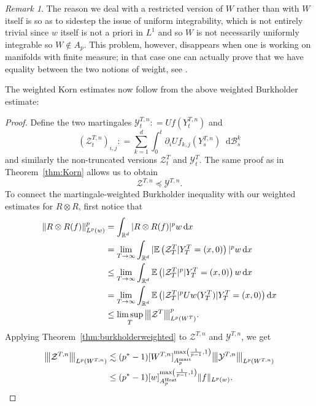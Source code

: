 \documentclass[11pt, a4paper]{amsart}
\theoremstyle{definition}
\theoremstyle{remark}
\newtheorem{remark}{Remark}
\newcommand{\R}{\mathbb{R}}
\newcommand*\diff{\mathop{}\!\mathrm{d}}
\newcommand{\vvvert}[1]{
    {\left\vert\kern-0.25ex\left\vert\kern-
    0.25ex\left\vert #1 
    \right\vert\kern-0.25ex\right\vert\kern-
    0.25ex\right\vert}
}
\begin{document}
\begin{remark}
The reason we deal with a restricted version of $W$
rather than with $W$ itself is so as to sidestep the issue of 
uniform integrability, which is not entirely trivial since $w$
itself is not a priori in $L^1$ and so $W$ is not
necessarily uniformly
integrable so $W\notin A_p$.
This problem, however, disappears when one is working
on manifolds with finite measure;
in that case one can actually prove that we have 
equality between the two notions of weight, see 
\cite[Theorem 4.2]{Li2019}.
\end{remark}
The weighted Korn estimates now follow from the 
above weighted Burkholder estimate:
\begin{proof}
Define the two martingales
$\mathcal Y^{T,n}_t\mathrel{:}=U f(Y^{T,n}_t)$ and 
\begin{equation*}
(\mathcal Z^{T,n}_t)_{i,j}\mathrel{:}=
\sum_{k=1}^d\int_0^t \partial_i U f_{k,j}(Y^{T,n}_s)
\diff \mathcal B^k_s
\end{equation*}
and similarly the non-truncated versions
$\mathcal Z^T_t$ and $\mathcal Y^T_t$.
The same proof as in Theorem~\ref{thm:Korn}
allows us to obtain
\begin{equation*}
\mathcal Z^{T,n}\preccurlyeq \mathcal Y^{T,n}.
\end{equation*}
To connect the martingale-weighted Burkholder
inequality 
with our weighted estimates for $R\otimes R$,
first notice that
\begin{align*}
\|R\otimes R(f)\|^p_{L^p(w)}
&=\int_{\R^d} |R\otimes R(f)|^p w\diff x\\
&=\lim_{T\to \infty}\int_{\R^d} |
\mathbb E\left(\mathcal Z^T_T|Y^T_T=(x,0)\right)|^pw\diff x\\
&\le \lim_{T\to \infty}\int_{\R^d} \mathbb E
\left(|\mathcal Z_T^T|^p|Y_T^T=(x,0)\right)w \diff x\\
&=\lim_{T\to \infty}\int_{\R^d} 
\mathbb E\left(|\mathcal Z_T^T|^p Uw(Y_T^T)|Y_T^T=(x,0)\right)
\diff x\\
&\le \limsup_T\vvvert{\mathcal Z^T}^p_{L^p(W^T)}.
\end{align*}
Applying Theorem~\ref{thm:burkholderweighted}
to $\mathcal Z^{T,n}$ and $\mathcal Y^{T,n}$, we get
\begin{align*}
\vvvert{\mathcal Z^{T,n}}_{L^p(W^{T,n})}
&\lesssim (p^*-1) [W^{T,n}]_{A_p^{\mathrm{mart}}}
^{\max\left(\frac1{p-1
},1\right)}\vvvert{\mathcal Y^{T,n}}_{L^p(W^{T,n})}
\\&\le (p^*-1)[w]_{A_p^{\text{\upshape Heat}}}^
{\max\left(\frac1{p-1
},1\right)} \|f\|_{L^p(w)}.

\end{align*}
\end{proof}
\end{document}
